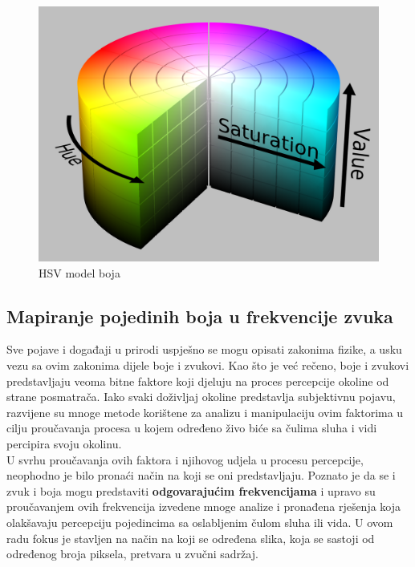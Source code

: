 \documentclass[12pt,a4paper]{article}
\begin{document}
\begin{figure}[H]

\center
\includegraphics[scale=0.2]{../res/hsv.png}
\caption{HSV model boja \cite{bels5}}
\label{hsv}

\end{figure}

\subsection{Mapiranje pojedinih boja u frekvencije zvuka}

Sve pojave i događaji u prirodi uspješno se mogu opisati zakonima fizike, a usku vezu sa ovim zakonima dijele boje i zvukovi. Kao što je već rečeno, boje i zvukovi predstavljaju veoma bitne faktore koji djeluju na proces percepcije okoline od strane posmatrača. Iako svaki doživljaj okoline predstavlja subjektivnu pojavu, razvijene su mnoge metode korištene za analizu i manipulaciju ovim faktorima u cilju proučavanja procesa u kojem određeno živo biće sa čulima sluha i vidi percipira svoju okolinu. \\

U svrhu proučavanja ovih faktora i njihovog udjela u procesu percepcije, neophodno je bilo pronaći način na koji se oni predstavljaju. Poznato je da se i zvuk i boja mogu predstaviti \textbf{odgovarajućim frekvencijama} i upravo su proučavanjem ovih frekvencija izvedene mnoge analize i pronađena rješenja koja olakšavaju percepciju pojedincima sa oslabljenim čulom sluha ili vida. U ovom radu fokus je stavljen na način na koji se određena slika, koja se sastoji od određenog broja piksela, pretvara u zvučni sadržaj.  \\
\end{document}

